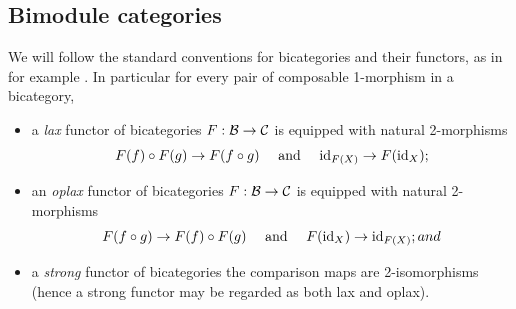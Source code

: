 \documentclass{amsart}
\begin{document}
%
%




\subsection{Bimodule categories} \label{sec:tc-bimod}
We will follow the standard conventions for bicategories and their functors, as in for example \cite{MR2664622}. In particular for every pair of composable 1-morphism in a bicategory, 
\begin{itemize}
	\item a {\em lax} functor of bicategories $F: \mathcal B \to \mathcal C$ is equipped with natural 2-morphisms
	\begin{equation*}
		F(f) \circ F(g) \to F(f \circ g) \quad \textrm{ and } \quad \mathrm{id}_{F(X)} \to F(\mathrm{id}_X);
	\end{equation*} 
	\item an {\em oplax} functor of bicategories $F: \mathcal B \to \mathcal C$ is equipped with natural 2-morphisms
	\begin{equation*}
		F(f \circ g) \to F(f) \circ F(g)   \quad \textrm{ and } \quad F(\mathrm{id}_X) \to \mathrm{id}_{F(X)}; and
	\end{equation*}
	\item a {\em strong} functor of bicategories the comparison maps are 2-isomorphisms (hence a strong functor may be regarded as both lax and oplax). 
\end{itemize}
\end{document}
